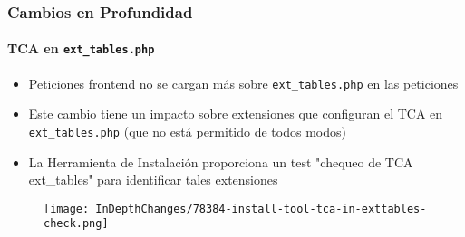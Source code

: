 \begin{frame}[fragile]
	\frametitle{Cambios en Profundidad}
	\framesubtitle{TCA en \texttt{ext\_tables.php}}

	\begin{itemize}
		\item Peticiones frontend no se cargan más sobre \texttt{ext\_tables.php} en las peticiones
		\item Este cambio tiene un impacto sobre extensiones que configuran el TCA en \texttt{ext\_tables.php}\newline
			\small(que no está permitido de todos modos)\normalsize
		\item La Herramienta de Instalación proporciona un test "chequeo de TCA ext\_tables" para identificar tales extensiones
	\end{itemize}

	\begin{figure}
		\texttt{[image: InDepthChanges/78384-install-tool-tca-in-exttables-check.png]}
	\end{figure}

\end{frame}
